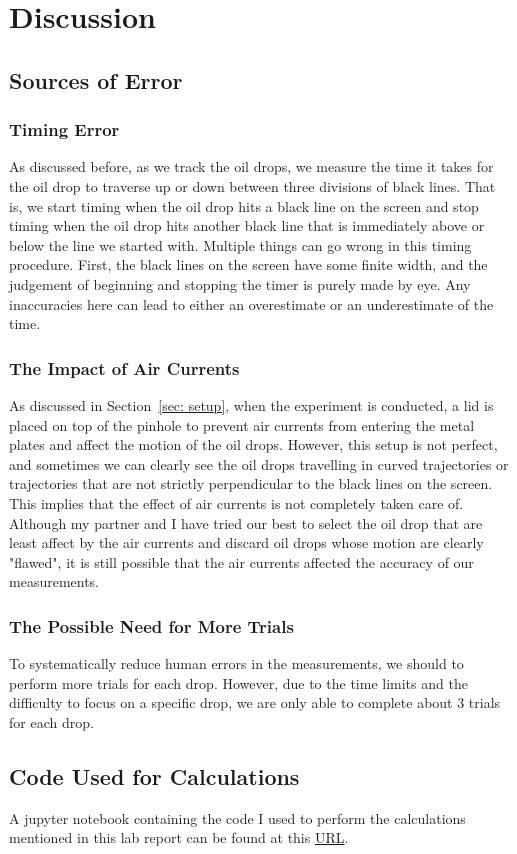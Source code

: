 \documentclass{article}
\begin{document}
\section{Discussion}

\subsection{Sources of Error}
\label{sec:sources}

\subsubsection{Timing Error}
As discussed before, as we track the oil drops, we measure the time it takes for the oil drop to traverse up or down between three divisions of black lines. That is, we start timing when the oil drop hits a black line on the screen and stop timing when the oil drop hits another black line that is immediately above or below the line we started with. Multiple things can go wrong in this timing procedure. First, the black lines on the screen have some finite width, and the judgement of beginning and stopping the timer is purely made by eye. Any inaccuracies here can lead to either an overestimate or an underestimate of the time. 

\subsubsection{The Impact of Air Currents}
As discussed in Section~\ref{sec: setup}, when the experiment is conducted, a lid is placed on top of the pinhole to prevent air currents from entering the metal plates and affect the motion of the oil drops. However, this setup is not perfect, and sometimes we can clearly see the oil drops travelling in curved trajectories or trajectories that are not strictly perpendicular to the black lines on the screen. This implies that the effect of air currents is not completely taken care of. Although my partner and I have tried our best to select the oil drop that are least affect by the air currents and discard oil drops whose motion are clearly "flawed", it is still possible that the air currents affected the accuracy of our measurements.

\subsubsection{The Possible Need for More Trials}
To systematically reduce human errors in the measurements, we should to perform more trials for each drop. However, due to the time limits and the difficulty to focus on a specific drop, we are only able to complete about 3 trials for each drop.


\subsection{Code Used for Calculations}
A jupyter notebook containing the code I used to perform the calculations mentioned in this lab report can be found at this \href{https://github.com/raindragon/oil_drop}{URL}.


\printbibliography
\end{document}
